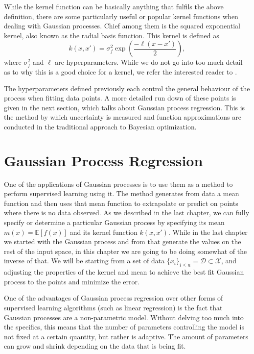 While the kernel function can be basically anything that fulfils the above definition, there are some particularly useful or popular kernel functions when dealing with Gaussian processes. Chief among them is the squared exponential kernel, also known as the radial basis function. This kernel is defined as
\[ k(x, x') = \sigma_f^2 \exp \left( \frac{- \ell (x - x')}{2} \right), \]
where $\sigma_f^2$ and $\ell$ are hyperparameters. While we do not go into too much detail as to why this is a good choice for a kernel, we refer the interested reader to \cite[\S 2.1]{garnett_bayesoptbook_2023}. 

The hyperparameters defined previously each control the general behaviour of the process when fitting data points. A more detailed run down of these points is given in the next section, which talks about Gaussian process regression. This is the method by which uncertainty is measured and function approximations are conducted in the traditional approach to Bayesian optimization. 

\section{Gaussian Process Regression}

One of the applications of Gaussian processes is to use them as a method to perform supervised learning using it. The method generates from data a mean function and then uses that mean function to extrapolate or predict on points where there is no data observed. As we described in the last chapter, we can fully specify or determine a particular Gaussian process by specifying its mean $m(x) = \mathbb{E}[f(x)]$ and its kernel function $k(x,x')$. While in the last chapter we started with the Gaussian process and from that generate the values on the rest of the input space, in this chapter we are going to be doing somewhat of the inverse of that. We will be starting from a set of data $\{ x_i \}_{i \leq n} = \mathcal{D} \subset \mathcal{X}$, and adjusting the properties of the kernel and mean to achieve the best fit Gaussian process to the points and minimize the error. 

One of the advantages of Gaussian process regression over other forms of supervised learning algorithms (such as linear regression) is the fact that Gaussian processes are a non-parametric model. Without delving too much into the specifics, this means that the number of parameters controlling the model is not fixed at a certain quantity, but rather is adaptive. The amount of parameters can grow and shrink depending on the data that is being fit. 

